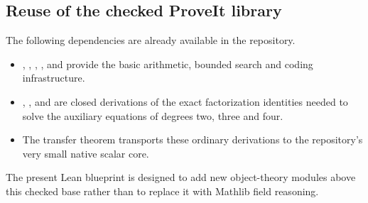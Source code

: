 \subsection{Reuse of the checked ProveIt library}

The following dependencies are already available in the repository.

\begin{itemize}
\item {}, ,
      , ,  and
       provide the basic arithmetic, bounded search and
      coding infrastructure.
\item {},
      , and  are closed derivations of the exact
      factorization identities needed to solve the auxiliary equations of
      degrees two, three and four.
\item The transfer theorem  transports these ordinary
      \ipra{} derivations to the repository's very small native scalar core.
\end{itemize}

The present Lean blueprint is designed to add new object-theory modules above
this checked base rather than to replace it with Mathlib field reasoning.
